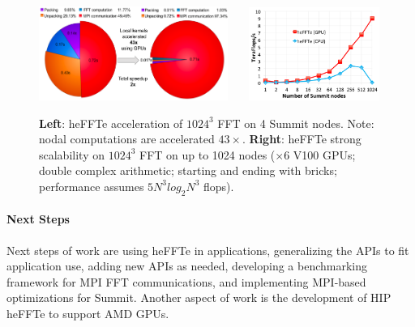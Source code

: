 \begin{figure}[htb]
   \centering
   \includegraphics[width=0.55\textwidth]{projects/2.3.3-MathLibs/2.3.3.13-CLOVER/heFFTeAcceleration}~~~
   \includegraphics[width=0.38\textwidth]{projects/2.3.3-MathLibs/2.3.3.13-CLOVER/heFFTeScalability}
    \caption{\label{fig:fft-ecp-progress}
    {\bf Left}: heFFTe acceleration of $1024^3$ FFT on 4 Summit nodes.
                Note: nodal computations are accelerated $43\times$. 
    {\bf Right}: heFFTe strong scalability on $1024^3$ 
                FFT on up to 1024 nodes ($\times 6$ V100 GPUs;
                double complex arithmetic; starting and ending with bricks; 
                performance assumes $5 N^3 log_2 N^3$ flops).}
\end{figure}


\paragraph{Next Steps}
Next steps of work are using heFFTe in applications, generalizing the APIs to fit application use,
adding new APIs as needed, developing a benchmarking framework for MPI FFT 
communications, and implementing MPI-based optimizations for Summit. 
Another aspect of work is the development of HIP heFFTe to support AMD GPUs. 
